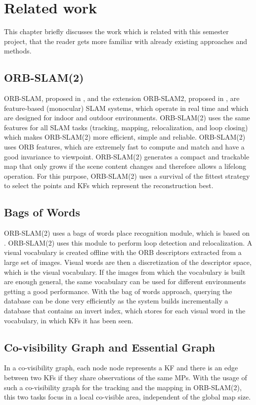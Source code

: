 \chapter{Related work}
\label{sec:related_work}

This chapter briefly discusses the work which is related with this semester project, that the reader gets more familiar with already existing approaches and methods.

\section{ORB-SLAM(2)}
ORB-SLAM, proposed in \cite{Mur-Artal2015}, and the extension ORB-SLAM2, proposed in \cite{Mur-Artal2016}, are feature-based (monocular) \ac{SLAM} systems, which operate in real time and which are designed for indoor and outdoor environments. ORB-SLAM(2) uses the same features for all \ac{SLAM} tasks (tracking, mapping, relocalization, and loop closing) which makes ORB-SLAM(2) more efficient, simple and reliable. ORB-SLAM(2) uses ORB features, which are extremely fast to compute and match and have a good invariance to viewpoint. ORB-SLAM(2) generates a compact and trackable map that only grows if the scene content changes and therefore allows a lifelong operation. For this purpose, ORB-SLAM(2) uses a survival of the fittest strategy to select the points and \acfp{KF} which represent the reconstruction best.

\section{Bags of Words}
ORB-SLAM(2) uses a bags of words place recognition module, which is based on \cite{Galvez-Lopez2012}. ORB-SLAM(2) uses this module to perform loop detection and relocalization. A visual vocabulary is created offline with the ORB descriptors extracted from a large set of images. Visual words are then a discretization of the descriptor space, which is the visual vocabulary. If the images from which the vocabulary is built are enough general, the same vocabulary can be used for different environments getting a good performance. With the bag of words approach, querying the database can be done very efficiently as the system builds incrementally a database that contains an invert index, which stores for each visual word in the vocabulary, in which \acp{KF} it has been seen.

\section{Co-visibility Graph and Essential Graph}
In a co-visibility graph, each node node represents a \ac{KF} and there is an edge between two \acp{KF} if they share observations of the same \acfp{MP}. With the usage of such a co-visibility graph for the tracking and the mapping in ORB-SLAM(2), this two tasks focus in a local co-visible area, independent of the global map size.

